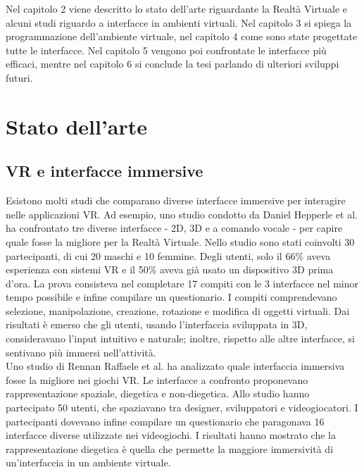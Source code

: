 \documentclass[target=bach,aauheader=]{thud}
\begin{document}
Nel capitolo 2 viene descritto lo stato dell'arte riguardante la Realtà Virtuale e alcuni studi riguardo a interfacce in ambienti virtuali.
Nel capitolo 3 si spiega la programmazione dell'ambiente virtuale, nel capitolo 4 come sono state progettate tutte le interfacce.
Nel capitolo 5 vengono poi confrontate le interfacce più efficaci, mentre nel capitolo 6 si conclude la tesi parlando di ulteriori sviluppi futuri.


\chapter{Stato dell'arte} %
\section{VR e interfacce immersive}
Esistono molti studi che comparano diverse interfacce immersive per interagire nelle applicazioni VR.
Ad esempio, uno studio condotto da Daniel Hepperle et al.\cite{Hepperle} ha confrontato tre diverse interfacce - 2D, 3D e a comando vocale - per capire quale fosse la migliore per la Realtà Virtuale.  
Nello studio sono stati coinvolti 30 partecipanti, di cui 20 maschi e 10 femmine.
Degli utenti, solo il 66\% aveva esperienza con sistemi VR e il 50\% aveva già usato un dispositivo 3D prima d'ora.
La prova consisteva nel completare 17 compiti con le 3 interfacce nel minor tempo possibile e infine compilare un questionario.
I compiti comprendevano selezione, manipolazione, creazione, rotazione e modifica di oggetti virtuali.
Dai risultati è emerso che gli utenti, usando l'interfaccia sviluppata in 3D, consideravano l'input intuitivo e naturale; inoltre, rispetto alle altre interfacce, si sentivano più immersi nell'attività. \\

Uno studio di Rennan Raffaele et al.\cite{Raffaele} ha analizzato quale interfaccia immersiva fosse la migliore nei giochi VR.
Le interfacce a confronto proponevano rappresentazione spaziale, diegetica e non-diegetica.
Allo studio hanno partecipato 50 utenti, che spaziavano tra designer, sviluppatori e videogiocatori.
I partecipanti dovevano infine compilare un questionario che paragonava 16 interfacce diverse utilizzate nei videogiochi.
I risultati hanno mostrato che la rappresentazione diegetica è quella che permette la maggiore immersività di un'interfaccia in un ambiente virtuale.
\end{document}
